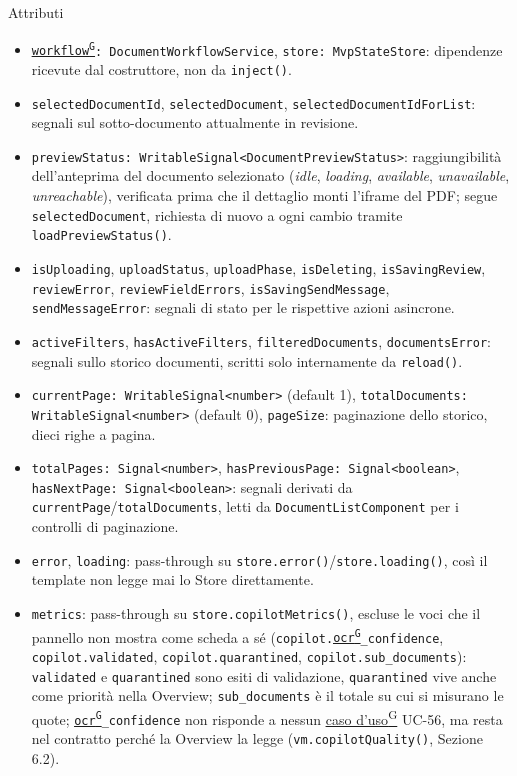 \documentclass[a4paper,12pt]{article}
\providecommand{\glslink}[2]{\href{https://alittlebyte-19.github.io/Documentazione/glossario.html\#gls-#1}{\underline{#2}\textsuperscript{\scriptsize G}}}
\begin{document}
\begin{sloppypar}
Attributi
\begin{itemize}\raggedright
    \item \texttt{\glslink{workflow}{workflow}: DocumentWorkflowService}, \texttt{store: MvpStateStore}: dipendenze ricevute dal costruttore, non da \texttt{inject()}.
    \item \texttt{selectedDocumentId}, \texttt{selectedDocument}, \texttt{selectedDocumentIdForList}: segnali sul sotto-documento attualmente in revisione.
    \item \texttt{previewStatus: WritableSignal<DocumentPreviewStatus>}: raggiungibilità dell'anteprima del documento selezionato (\textit{idle}, \textit{loading}, \textit{available}, \textit{unavailable}, \textit{unreachable}), verificata prima che il dettaglio monti l'iframe del PDF; segue \texttt{selectedDocument}, richiesta di nuovo a ogni cambio tramite \texttt{loadPreviewStatus()}.
    \item \texttt{isUploading}, \texttt{uploadStatus}, \texttt{uploadPhase}, \texttt{isDeleting}, \texttt{isSavingReview}, \texttt{reviewError}, \texttt{reviewFieldErrors}, \texttt{isSavingSendMessage}, \texttt{sendMessageError}: segnali di stato per le rispettive azioni asincrone.
    \item \texttt{activeFilters}, \texttt{hasActiveFilters}, \texttt{filteredDocuments}, \texttt{documentsError}: segnali sullo storico documenti, scritti solo internamente da \texttt{reload()}.
    \item \texttt{currentPage: WritableSignal<number>} (default 1), \texttt{totalDocuments: WritableSignal<number>} (default 0), \texttt{pageSize}: paginazione dello storico, dieci righe a pagina.
    \item \texttt{totalPages: Signal<number>}, \texttt{hasPreviousPage: Signal<boolean>}, \texttt{hasNextPage: Signal<boolean>}: segnali derivati da \texttt{currentPage}/\texttt{totalDocuments}, letti da \texttt{DocumentListComponent} per i controlli di paginazione.
    \item \texttt{error}, \texttt{loading}: pass-through su \texttt{store.error()}/\texttt{store.loading()}, così il template non legge mai lo Store direttamente.
    \item \texttt{metrics}: pass-through su \texttt{store.copilotMetrics()}, escluse le voci che il pannello non mostra come scheda a sé (\texttt{copilot.\glslink{ocr-riconoscimento-ottico-dei-caratteri}{ocr}\_confidence}, \texttt{copilot.validated}, \texttt{copilot.quarantined}, \texttt{copilot.sub\_documents}): \texttt{validated} e \texttt{quarantined} sono esiti di validazione, \texttt{quarantined} vive anche come priorità nella Overview; \texttt{sub\_documents} è il totale su cui si misurano le quote; \texttt{\glslink{ocr-riconoscimento-ottico-dei-caratteri}{ocr}\_confidence} non risponde a nessun \glslink{caso-d-uso-uc}{caso d'uso} UC-56, ma resta nel contratto perché la Overview la legge (\texttt{vm.copilotQuality()}, Sezione 6.2).

\end{itemize}
\end{sloppypar}
\end{document}
